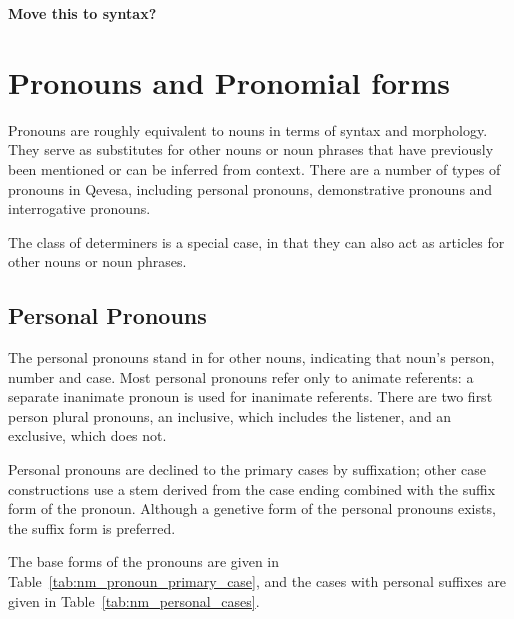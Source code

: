 \documentclass[grammar]{subfiles}
\begin{document}
  \textbf{Move this to syntax?}

  \section{Pronouns and Pronomial forms}
  \label{sec:nm_pronouns}

  Pronouns are roughly equivalent to nouns in terms of syntax and morphology. They serve as substitutes for other nouns or noun phrases that have previously been mentioned or can be inferred from context. There are a number of types of pronouns in Qevesa, including personal pronouns, demonstrative pronouns and interrogative pronouns.

  The class of determiners is a special case, in that they can also act as articles for other nouns or noun phrases.

  \subsection{Personal Pronouns}
  \label{ssec:nm_personal_pronouns}

  The personal pronouns stand in for other nouns, indicating that noun's person, number and case. Most personal pronouns refer only to animate referents: a separate inanimate pronoun is used for inanimate referents. There are two first person plural pronouns, an inclusive, which includes the listener, and an exclusive, which does not. 

  Personal pronouns are declined to the primary cases by suffixation; other case constructions use a stem derived from the case ending combined with the suffix form of the pronoun. Although a genetive form of the personal pronouns exists, the suffix form is preferred. 

  The base forms of the pronouns are given in Table~\ref{tab:nm_pronoun_primary_case}, and the cases with personal suffixes are given in Table~\ref{tab:nm_personal_cases}.
\end{document}
